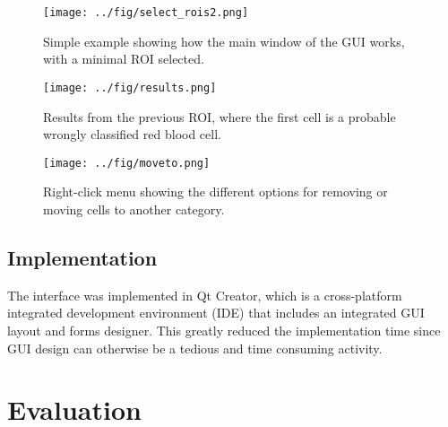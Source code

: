 \begin{figure}[h!]
    \centering
    \texttt{[image: ../fig/select\_rois2.png]}
    \caption{Simple example showing how the main window of the GUI works, with a minimal ROI selected.}
    \label{fig:gui_main}
\end{figure}

\begin{figure}[h!]
    \centering
    \texttt{[image: ../fig/results.png]}
    \caption{Results from the previous ROI, where the first cell is a probable wrongly classified red blood cell.}
    \label{fig:gui_results}
\end{figure}

\begin{figure}[h!]
    \centering
    \texttt{[image: ../fig/moveto.png]}
    \caption{Right-click menu showing the different options for removing or moving cells to another category.}
    \label{fig:gui_remove}
\end{figure}


\subsection{Implementation}
The interface was implemented in Qt Creator, which is a cross-platform integrated development environment (IDE) that includes an integrated GUI layout and forms designer. This greatly reduced the implementation time since GUI design can otherwise be a tedious and time consuming activity. 

\section{Evaluation}\label{sec:research:history}
